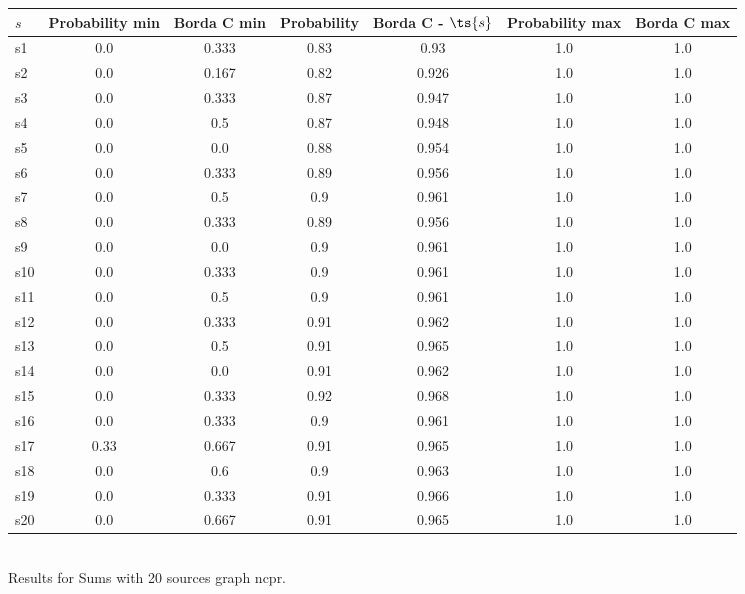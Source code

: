 \documentclass{article}
\begin{document}
\noindent\begin{tabular}{|l|c|c|c|c|c|c|}
\hline
$s$& Probability min & Borda C min & Probability & Borda C - $\ts{s}$ & Probability max & Borda C max\\
\hline
s1 &0.0 & 0.333 & 0.83 & 0.93 & 1.0 & 1.0\\
\hline
s2 &0.0 & 0.167 & 0.82 & 0.926 & 1.0 & 1.0\\
\hline
s3 &0.0 & 0.333 & 0.87 & 0.947 & 1.0 & 1.0\\
\hline
s4 &0.0 & 0.5 & 0.87 & 0.948 & 1.0 & 1.0\\
\hline
s5 &0.0 & 0.0 & 0.88 & 0.954 & 1.0 & 1.0\\
\hline
s6 &0.0 & 0.333 & 0.89 & 0.956 & 1.0 & 1.0\\
\hline
s7 &0.0 & 0.5 & 0.9 & 0.961 & 1.0 & 1.0\\
\hline
s8 &0.0 & 0.333 & 0.89 & 0.956 & 1.0 & 1.0\\
\hline
s9 &0.0 & 0.0 & 0.9 & 0.961 & 1.0 & 1.0\\
\hline
s10 &0.0 & 0.333 & 0.9 & 0.961 & 1.0 & 1.0\\
\hline
s11 &0.0 & 0.5 & 0.9 & 0.961 & 1.0 & 1.0\\
\hline
s12 &0.0 & 0.333 & 0.91 & 0.962 & 1.0 & 1.0\\
\hline
s13 &0.0 & 0.5 & 0.91 & 0.965 & 1.0 & 1.0\\
\hline
s14 &0.0 & 0.0 & 0.91 & 0.962 & 1.0 & 1.0\\
\hline
s15 &0.0 & 0.333 & 0.92 & 0.968 & 1.0 & 1.0\\
\hline
s16 &0.0 & 0.333 & 0.9 & 0.961 & 1.0 & 1.0\\
\hline
s17 &0.33 & 0.667 & 0.91 & 0.965 & 1.0 & 1.0\\
\hline
s18 &0.0 & 0.6 & 0.9 & 0.963 & 1.0 & 1.0\\
\hline
s19 &0.0 & 0.333 & 0.91 & 0.966 & 1.0 & 1.0\\
\hline
s20 &0.0 & 0.667 & 0.91 & 0.965 & 1.0 & 1.0\\
\hline
\end{tabular}\\

\noindent Results for Sums with 20 sources graph ncpr.
\end{document}
